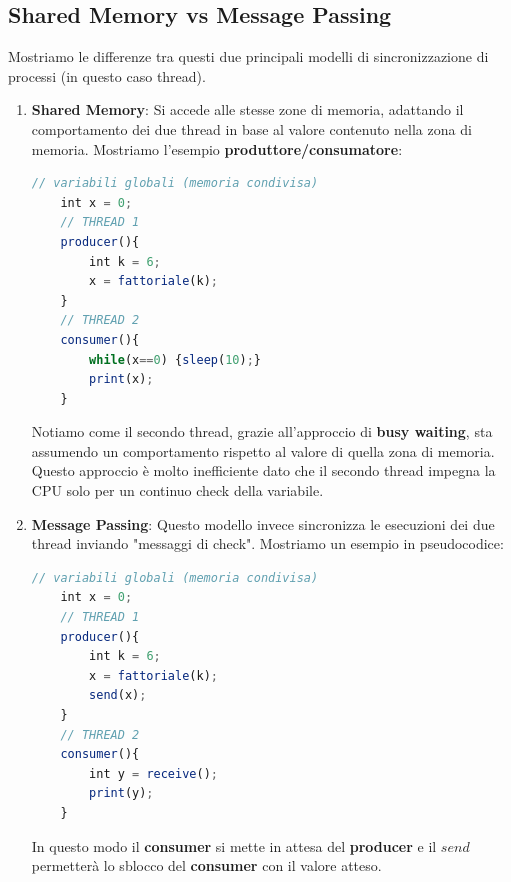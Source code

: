 \documentclass{article}
\begin{document}
\newpage

\subsection{Shared Memory vs Message Passing}

Mostriamo le differenze tra questi due principali modelli di sincronizzazione di processi (in questo caso thread).

\begin{enumerate}
    \item \textbf{Shared Memory}: Si accede alle stesse zone di memoria, adattando il comportamento dei due thread in base al valore contenuto nella zona di memoria. Mostriamo l'esempio \textbf{produttore/consumatore}:

\vspace*{10px}
\begin{lstlisting}[language = JavaScript]
    // variabili globali (memoria condivisa)
    int x = 0;
    // THREAD 1
    producer(){
        int k = 6;
        x = fattoriale(k);
    }
    // THREAD 2
    consumer(){
        while(x==0) {sleep(10);}
        print(x);
    }
\end{lstlisting}
\vspace*{-15px}

Notiamo come il secondo thread, grazie all'approccio di \textbf{busy waiting}, sta assumendo un comportamento rispetto al valore di quella zona di memoria. Questo approccio è molto inefficiente dato che il secondo thread impegna la CPU solo per un continuo check della variabile.

\vspace*{15px}

\item \textbf{Message Passing}: Questo modello invece sincronizza le esecuzioni dei due thread inviando "messaggi di check". Mostriamo un esempio in pseudocodice:

\vspace*{10px}
\begin{lstlisting}[language = JavaScript]
    // variabili globali (memoria condivisa)
    int x = 0;
    // THREAD 1
    producer(){
        int k = 6;
        x = fattoriale(k);
        send(x);
    }
    // THREAD 2
    consumer(){
        int y = receive();
        print(y);
    }
\end{lstlisting}
\vspace*{-15px}

In questo modo il \textbf{consumer} si mette in attesa del \textbf{producer} e il $send$ permetterà lo sblocco del \textbf{consumer} con il valore atteso.

\end{enumerate}
\end{document}
